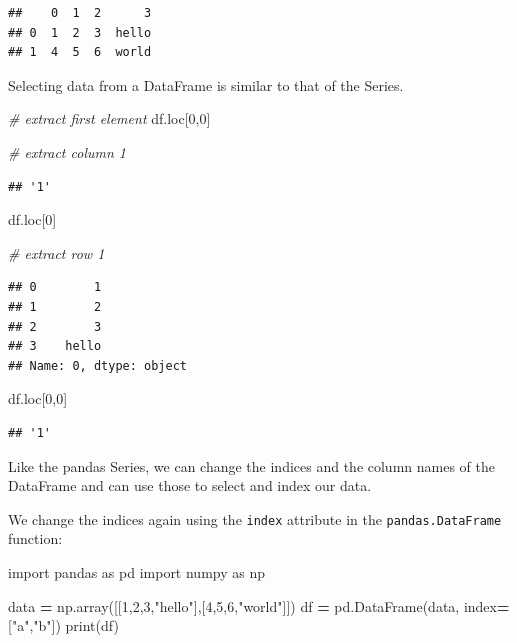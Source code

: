\documentclass[
]{book}
\newenvironment{Shaded}{\begin{snugshade}}{\end{snugshade}}
\newcommand{\BuiltInTok}[1]{#1}
\newcommand{\CommentTok}[1]{\textcolor[rgb]{0.56,0.35,0.01}{\textit{#1}}}
\newcommand{\DecValTok}[1]{\textcolor[rgb]{0.00,0.00,0.81}{#1}}
\newcommand{\ImportTok}[1]{#1}
\newcommand{\NormalTok}[1]{#1}
\newcommand{\OperatorTok}[1]{\textcolor[rgb]{0.81,0.36,0.00}{\textbf{#1}}}
\newcommand{\StringTok}[1]{\textcolor[rgb]{0.31,0.60,0.02}{#1}}
\begin{document}
\begin{verbatim}
##    0  1  2      3
## 0  1  2  3  hello
## 1  4  5  6  world
\end{verbatim}

Selecting data from a DataFrame is similar to that of the Series.

\begin{Shaded}
\begin{Highlighting}[]
\CommentTok{\# extract first element }
\NormalTok{df.loc[}\DecValTok{0}\NormalTok{,}\DecValTok{0}\NormalTok{]}

\CommentTok{\# extract column 1}
\end{Highlighting}
\end{Shaded}

\begin{verbatim}
## '1'
\end{verbatim}

\begin{Shaded}
\begin{Highlighting}[]
\NormalTok{df.loc[}\DecValTok{0}\NormalTok{]}

\CommentTok{\# extract row 1}
\end{Highlighting}
\end{Shaded}

\begin{verbatim}
## 0        1
## 1        2
## 2        3
## 3    hello
## Name: 0, dtype: object
\end{verbatim}

\begin{Shaded}
\begin{Highlighting}[]
\NormalTok{df.loc[}\DecValTok{0}\NormalTok{,}\DecValTok{0}\NormalTok{]}
\end{Highlighting}
\end{Shaded}

\begin{verbatim}
## '1'
\end{verbatim}

Like the pandas Series, we can change the indices and the column names of the DataFrame and can use those to select and index our data.

We change the indices again using the \texttt{index} attribute in the \texttt{pandas.DataFrame} function:

\begin{Shaded}
\begin{Highlighting}[]
\ImportTok{import}\NormalTok{ pandas }\ImportTok{as}\NormalTok{ pd}
\ImportTok{import}\NormalTok{ numpy }\ImportTok{as}\NormalTok{ np}

\NormalTok{data }\OperatorTok{=}\NormalTok{ np.array([[}\DecValTok{1}\NormalTok{,}\DecValTok{2}\NormalTok{,}\DecValTok{3}\NormalTok{,}\StringTok{"hello"}\NormalTok{],[}\DecValTok{4}\NormalTok{,}\DecValTok{5}\NormalTok{,}\DecValTok{6}\NormalTok{,}\StringTok{"world"}\NormalTok{]])}
\NormalTok{df }\OperatorTok{=}\NormalTok{ pd.DataFrame(data, index}\OperatorTok{=}\NormalTok{[}\StringTok{"a"}\NormalTok{,}\StringTok{"b"}\NormalTok{])}
\BuiltInTok{print}\NormalTok{(df)}
\end{Highlighting}
\end{Shaded}
\end{document}
